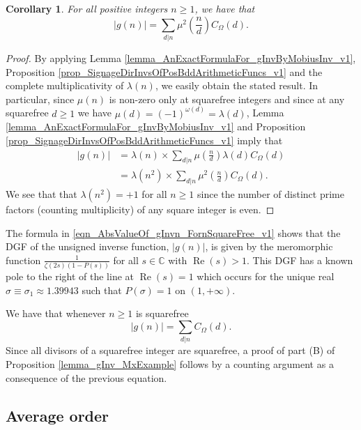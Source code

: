 \documentclass[11pt,reqno,a4letter]{article}
\newcommand{\hlocalref}[1]{\hyperref[#1]{\ref{#1}}}
\numberwithin{equation}{section}
\numberwithin{figure}{section}
\numberwithin{table}{section}
\theoremstyle{plain}
\newtheorem{cor}[theorem]{Corollary}
\numberwithin{theorem}{section}
\theoremstyle{definition}
\renewcommand{\Re}{\operatorname{Re}}
\begin{document}
\begin{cor} 
\label{lemma_AbsValueOf_gInvn_FornSquareFree_v1} 
For all positive integers $n \geq 1$, we have that 
\begin{equation} 
\label{eqn_AbsValueOf_gInvn_FornSquareFree_v1} 
|g(n)| = \sum_{d|n} \mu^2\left(\frac{n}{d}\right) C_{\Omega}(d). 
\end{equation} 
\end{cor} 
\begin{proof} 
By applying 
Lemma \hlocalref{lemma_AnExactFormulaFor_gInvByMobiusInv_v1}, 
Proposition \hlocalref{prop_SignageDirInvsOfPosBddArithmeticFuncs_v1} and the 
complete multiplicativity of $\lambda(n)$, 
we easily obtain the stated result. 
In particular, since $\mu(n)$ is non-zero only at squarefree integers and since 
at any squarefree $d \geq 1$ we have $\mu(d) = (-1)^{\omega(d)} = \lambda(d)$, 
Lemma \hlocalref{lemma_AnExactFormulaFor_gInvByMobiusInv_v1} and 
Proposition \hlocalref{prop_SignageDirInvsOfPosBddArithmeticFuncs_v1} imply that  
\begin{align*} 
|g(n)| & = \lambda(n) \times \sum_{d|n} \mu\left(\frac{n}{d}\right) \lambda(d) C_{\Omega}(d) \\ 
     & = \lambda(n^2) \times \sum_{d|n} \mu^2\left(\frac{n}{d}\right) C_{\Omega}(d). 
\end{align*} 
We see that 
that $\lambda(n^2) = +1$ for all $n \geq 1$ since the number of distinct 
prime factors (counting multiplicity) of any square integer is even. 
\end{proof} 

The formula in \eqref{eqn_AbsValueOf_gInvn_FornSquareFree_v1} shows that 
the DGF of the unsigned inverse function, $|g(n)|$, 
is given by the meromorphic function 
$\frac{1}{\zeta(2s)(1-P(s))}$ for all $s \in \mathbb{C}$ with $\Re(s) > 1$. 
This DGF has a known pole to the right of the line at $\Re(s) = 1$ 
which occurs for the unique real $\sigma \equiv \sigma_1 \approx 1.39943$ 
such that $P(\sigma) = 1$ on $(1, +\infty)$. 

We have that whenever $n \geq 1$ is squarefree 
\[
|g(n)| = \sum_{d|n} C_{\Omega}(d). 
\]
Since all divisors of a squarefree integer are squarefree, 
a proof of part (B) of Proposition \hlocalref{lemma_gInv_MxExample} 
follows by a counting argument as a consequence 
of the previous equation. 

\subsection{Average order} 
\end{document}
